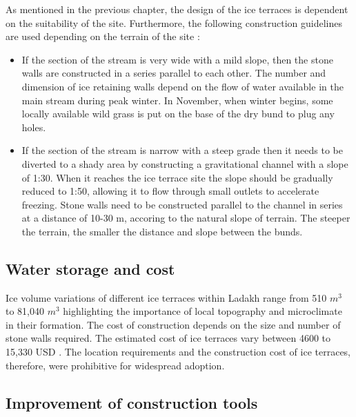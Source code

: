 As mentioned in the previous chapter, the design of the ice terraces is dependent on the suitability of the
site. Furthermore, the following construction guidelines are used depending on the terrain of the site
\cite{norphelSnowWaterHarvesting2015}:

\begin{itemize}

  \item If the section of the stream is very wide with a mild slope, then the stone walls are
    constructed in a series parallel to each other. The number and dimension of ice retaining walls depend on
    the flow of water available in the main stream during peak winter. In November, when winter begins, some
    locally available wild grass is put on the base of the dry bund to plug any holes.

  \item If the section of the stream is narrow with a steep grade then it needs to be diverted to a shady area
    by constructing a gravitational channel with a slope of 1:30. When it reaches the ice terrace site the slope
    should be gradually reduced to 1:50, allowing it to flow through small outlets to accelerate freezing. Stone
    walls need to be constructed parallel to the channel in series at a distance of 10-30 m, accoring to the
    natural slope of terrain. The steeper the terrain, the smaller the distance and slope between the bunds.

\end{itemize}


\subsection{Water storage and cost}

Ice volume variations of different ice terraces within Ladakh \citep{nusserSociohydrologyArtificialGlaciers2019,
norphelSnowWaterHarvesting2015} range from 510 $m^3$ to 81,040 $m^3$ highlighting the importance of local topography and
microclimate in their formation. The cost of construction depends on the size and number of stone walls
required. The estimated cost of ice terraces vary between 4600 to 15,330 USD
\cite{nusserSociohydrologyArtificialGlaciers2019}. The location requirements and the construction cost of ice
terraces, therefore, were prohibitive for widespread adoption.

\subsection{Improvement of construction tools}

